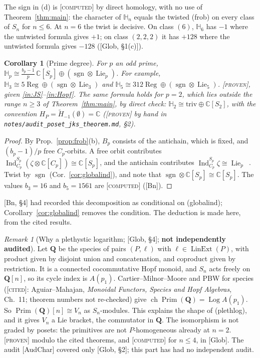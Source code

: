 \documentclass[11pt]{article}
\newtheorem{corollary}[theorem]{Corollary}
\theoremstyle{definition}
\theoremstyle{remark}
\newtheorem{remark}[theorem]{Remark}
\newcommand{\Lin}{\operatorname{LinExt}}
\newcommand{\Lie}{\operatorname{Lie}}
\newcommand{\sgn}{\operatorname{sgn}}
\newcommand{\Ind}{\operatorname{Ind}}
\newcommand{\ch}{\operatorname{ch}}
\newcommand{\HH}{\mathbb H}
\newcommand{\st}[1]{\textup{[\textsc{#1}]}}
\newcommand{\src}[1]{\nolinkurl{#1}}
\begin{document}
The sign in (d) is \st{computed} by direct homology, with no use of
Theorem~\ref{thm:main}: the character of $\HH_n$ equals the twisted (frob) on
every class of $S_n$ for $n\le6$. At $n=6$ the twist is decisive. On class
$(6)$, $\HH_6$ has $-1$ where the untwisted formula gives $+1$; on class
$(2,2,2)$ it has $+128$ where the untwisted formula gives $-128$
([Glob, \S1(c)]).

\begin{corollary}[Prime degree]\label{cor:prime}
For $p$ an odd prime,
$\HH_p\cong\frac{b_p-1}{p}\,\mathbb C[S_p]\oplus(\sgn\otimes\Lie_p)$. For
example, $\HH_3\cong5\operatorname{Reg}\oplus(\sgn\otimes\Lie_3)$ and
$\HH_5\cong312\operatorname{Reg}\oplus(\sgn\otimes\Lie_5)$. \st{proven},
given \ref{in:JS}--\ref{in:Hopf}. The same formula holds for $p=2$, which
lies outside the range $n\ge3$ of Theorem~\ref{thm:main}, by direct check:
$\HH_2\cong\mathrm{triv}\oplus\mathbb C[S_2]$, with the convention
$H_P=\widetilde H_{-1}(\emptyset)=\mathbb C$ (\st{proven} by hand in \src{notes/audit_poset_jks_theorem.md}, \S2).
\end{corollary}

\begin{proof}
By Prop.~\ref{prop:frob}(b), $B_p$ consists of the antichain, which is
fixed, and $(b_p-1)/p$ free $C_p$-orbits. A free orbit contributes
$\Ind_{C_p}^{S_p}(\zeta\otimes\mathbb C[C_p])\cong\mathbb C[S_p]$, and the
antichain contributes $\Ind_{C_p}^{S_p}\zeta\cong\Lie_p$~\cite{Klyachko}.
Twist by $\sgn$ (Cor.~\ref{cor:globalind}), and note that
$\sgn\otimes\mathbb C[S_p]\cong\mathbb C[S_p]$. The values $b_3=16$ and
$b_5=1561$ are \st{computed} ([Bn]).
\end{proof}

[Bn, \S4] had recorded this decomposition as conditional on (globalind);
Corollary~\ref{cor:globalind} removes the condition. The deduction is made
here, from the cited results.

\begin{remark}[Why a plethystic logarithm; {[Glob, \S4]}; \textbf{not
independently audited}]
Let $\mathbf Q$ be the species of pairs $(P,\ell)$ with $\ell\in\Lin(P)$, with
product given by disjoint union and concatenation, and coproduct given by
restriction. It is a connected cocommutative Hopf monoid, and $S_n$ acts
freely on $\mathbf Q[n]$, so its cycle index is $A(p_1)$.
Cartier--Milnor--Moore and PBW for species (\st{cited}: Aguiar--Mahajan,
\emph{Monoidal Functors, Species and Hopf Algebras}, Ch.~11; theorem
numbers not re-checked) give
$\ch\operatorname{Prim}(\mathbf Q)=\operatorname{Log}A(p_1)$. So
$\operatorname{Prim}(\mathbf Q)[n]\cong V_n$ as $S_n$-modules. This explains
the shape of (plethlog), and it gives $V_n$ a Lie bracket, the commutator
in $\mathbf Q$. The isomorphism is not graded by posets: the primitives are
not $P$-homogeneous already at $n=2$. \st{proven} modulo the cited theorems,
and \st{computed} for $n\le4$, in [Glob]. The audit [AudChar] covered only
[Glob, \S2]; this part has had no independent audit.
\end{remark}
\end{document}
